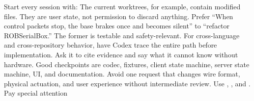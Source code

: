 {}\markdownRendererSectionBegin
{}\markdownRendererInterblockSeparator
{}Start every session with:\markdownRendererInterblockSeparator
{}\markdownRendererInterblockSeparator
{}The current worktrees, for example, contain modified\markdownRendererSoftLineBreak
{} files. They are user state, not permission to\markdownRendererSoftLineBreak
{}discard anything.\markdownRendererInterblockSeparator
{}
\markdownRendererSectionEnd \markdownRendererSectionBegin
{}\markdownRendererInterblockSeparator
{}Prefer “When control packets stop, the base brakes once and becomes silent” to\markdownRendererSoftLineBreak
{}“refactor ROBSerialBox.” The former is testable and safety-relevant.\markdownRendererInterblockSeparator
{}
\markdownRendererSectionEnd \markdownRendererSectionBegin
{}\markdownRendererInterblockSeparator
{}For cross-language and cross-repository behavior, have Codex trace the entire\markdownRendererSoftLineBreak
{}path before implementation. Ask it to cite evidence and say what it cannot\markdownRendererSoftLineBreak
{}know without hardware.\markdownRendererInterblockSeparator
{}
\markdownRendererSectionEnd \markdownRendererSectionBegin
{}\markdownRendererInterblockSeparator
{}Good checkpoints are codec, fixtures, client state machine, server state\markdownRendererSoftLineBreak
{}machine, UI, and documentation. Avoid one request that changes wire format,\markdownRendererSoftLineBreak
{}physical actuation, and user experience without intermediate review.\markdownRendererInterblockSeparator
{}
\markdownRendererSectionEnd \markdownRendererSectionBegin
{}\markdownRendererInterblockSeparator
{}\markdownRendererInterblockSeparator
{}
\markdownRendererSectionEnd \markdownRendererSectionBegin
{}\markdownRendererInterblockSeparator
{}Use , , and . Pay special attention\markdownRendererSoftLineBreak
